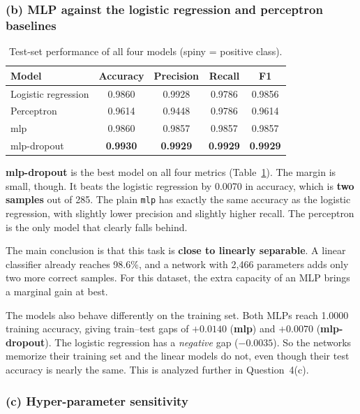 \documentclass[11pt]{article}
\begin{document}
\FloatBarrier
\subsubsection*{(b) MLP against the logistic regression and perceptron baselines}

\begin{table}[H]
\centering
\caption{Test-set performance of all four models (spiny = positive class).}
\label{tab:q3b}
\small
\begin{tabular}{lcccc}
\toprule
Model & Accuracy & Precision & Recall & F1 \\
\midrule
Logistic regression    & 0.9860 & 0.9928 & 0.9786 & 0.9856 \\
Perceptron             & 0.9614 & 0.9448 & 0.9786 & 0.9614 \\
mlp           & 0.9860 & 0.9857 & 0.9857 & 0.9857 \\
mlp-dropout  & \textbf{0.9930} & \textbf{0.9929} & \textbf{0.9929} & \textbf{0.9929} \\
\bottomrule
\end{tabular}
\end{table}

\textbf{mlp-dropout} is the best model on all four metrics (Table~\ref{tab:q3b}). The margin is small, though. It beats the logistic regression by 0.0070 in accuracy, which is \textbf{two samples} out of 285. The plain \texttt{mlp} has exactly the same accuracy as the logistic regression, with slightly lower precision and slightly higher recall. The perceptron is the only model that clearly falls behind.

The main conclusion is that this task is \textbf{close to linearly separable}. A linear classifier already reaches 98.6\%, and a network with 2{,}466 parameters adds only two more correct samples. For this dataset, the extra capacity of an MLP brings a marginal gain at best.

The models also behave differently on the training set. Both MLPs reach 1.0000 training accuracy, giving train--test gaps of $+0.0140$ (\textbf{mlp}) and $+0.0070$ (\textbf{mlp-dropout}). The logistic regression has a \emph{negative} gap ($-0.0035$). So the networks memorize their training set and the linear models do not, even though their test accuracy is nearly the same. This is analyzed further in Question~4(c).

\FloatBarrier
\subsubsection*{(c) Hyper-parameter sensitivity}
\end{document}
